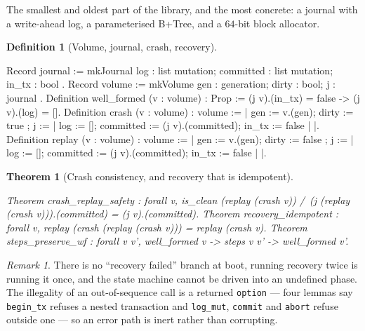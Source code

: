 \documentclass[10pt,journal,compsoc,twocolumn]{article}
\newtheorem{theorem}{Theorem}[section]
\theoremstyle{definition}
\newtheorem{definition}{Definition}[section]
\theoremstyle{remark}
\newtheorem{remark}{Remark}[section]
\theoremstyle{plain}
\newcommand{\ctr}[1]{\texttt{#1}}
\begin{document}
The smallest and oldest part of the library, and the most concrete: a journal
with a write-ahead log, a parameterised B+Tree, and a \(64\)-bit block allocator.

\begin{definition}[Volume, journal, crash, recovery]
\begin{coc}
Record journal := mkJournal { log : list mutation; committed : list mutation; in_tx : bool }.
Record volume   := mkVolume { gen : generation; dirty : bool; j : journal }.
Definition well_formed (v : volume) : Prop := (j v).(in_tx) = false -> (j v).(log) = [].
Definition crash  (v : volume) : volume := {| gen := v.(gen); dirty := true
  ; j := {| log := []; committed := (j v).(committed); in_tx := false |} |}.
Definition replay (v : volume) : volume := {| gen := v.(gen); dirty := false
  ; j := {| log := []; committed := (j v).(committed); in_tx := false |} |}.
\end{coc}\end{definition}
\begin{theorem}[Crash consistency, and recovery that is idempotent]
\begin{coc}
Theorem crash_replay_safety : forall v, is_clean (replay (crash v)) /\
  (j (replay (crash v))).(committed) = (j v).(committed).
Theorem recovery_idempotent : forall v, replay (crash (replay (crash v))) = replay (crash v).
Theorem steps_preserve_wf : forall v v', well_formed v -> steps v v' -> well_formed v'.
\end{coc}\end{theorem}
\begin{remark}
There is no ``recovery failed'' branch at boot, running recovery twice is running
it once, and the state machine cannot be driven into an undefined phase. The
illegality of an out-of-sequence call is a returned \ctr{option} --- four lemmas
say \ctr{begin\_tx} refuses a nested transaction and \ctr{log\_mut}, \ctr{commit}
and \ctr{abort} refuse outside one --- so an error path is inert rather than
corrupting.
\end{remark}
\end{document}
